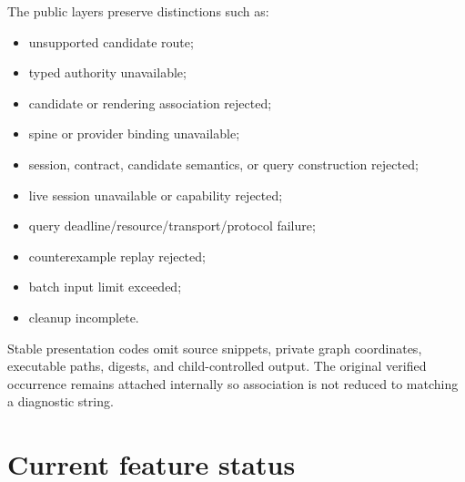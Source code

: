 \documentclass[10pt,letterpaper,oneside]{report}
\begin{document}
The public layers preserve distinctions such as:

\begin{itemize}
\item unsupported candidate route;
\item typed authority unavailable;
\item candidate or rendering association rejected;
\item spine or provider binding unavailable;
\item session, contract, candidate semantics, or query construction rejected;
\item live session unavailable or capability rejected;
\item query deadline/resource/transport/protocol failure;
\item counterexample replay rejected;
\item batch input limit exceeded;
\item cleanup incomplete.
\end{itemize}

Stable presentation codes omit source snippets, private graph coordinates, executable paths, digests, and child-controlled output. The original verified occurrence remains attached internally so association is not reduced to matching a diagnostic string.

\section{Current feature status}
\end{document}
